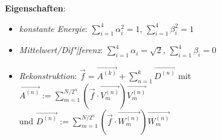 \linie

\textbf{Eigenschaften}:
\begin{itemize}
    \item 
    \emph{konstante Energie}:
    $\sum_{i=1}^4 \alpha_i^2 = 1$,
    $\sum_{i=1}^4 \beta_i^2 = 1$
    
    \item
    \emph{Mittelwert/Dif"|ferenz}:
    $\sum_{i=1}^4 \alpha_i = \sqrt{2}$,
    $\sum_{i=1}^4 \beta_i = 0$
    
    \item
    \emph{Rekonstruktion}:
    $\vec{f} = \vec{A^{(k)}} + \sum_{n=1}^k \vec{D^{(n)}}$
    mit $\vec{A^{(n)}} := \sum_{m=1}^{N/2^n} (\vec{f} \cdot \vec{V_m^{(n)}}) \vec{V_m^{(n)}}$\\
    und $\vec{D^{(n)}} := \sum_{m=1}^{N/2^n} (\vec{f} \cdot \vec{W_m^{(n)}}) \vec{W_m^{(n)}}$
\end{itemize}

\pagebreak
